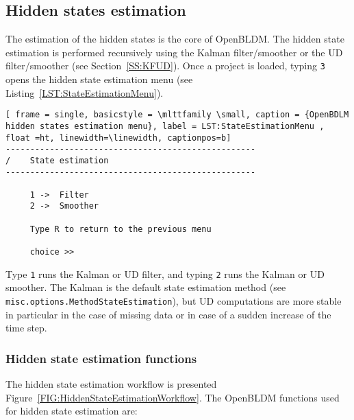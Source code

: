 \subsection{Hidden states estimation}
\label{S:HIDDENSTATESESTIMATION}

The estimation of the hidden states is the core of OpenBLDM.
The hidden state estimation is performed recursively using the Kalman filter/smoother or the UD filter/smoother (see Section~\ref{SS:KFUD}).
Once a project is loaded, typing \colorbox{light-gray}{\lstinline[basicstyle = \mlttfamily \small ]!3!} opens the hidden state estimation menu (see Listing~\ref{LST:StateEstimationMenu}).

\begin{lstlisting}[ frame = single, basicstyle = \mlttfamily \small, caption = {OpenBDLM hidden states estimation menu}, label = LST:StateEstimationMenu ,  float =ht, linewidth=\linewidth, captionpos=b]
---------------------------------------------------
/    State estimation
---------------------------------------------------

     1 ->  Filter 
     2 ->  Smoother 

     Type R to return to the previous menu 

     choice >> 
\end{lstlisting}

Type  \colorbox{light-gray}{\lstinline[basicstyle = \mlttfamily \small ]!1!} runs the Kalman or UD filter, and typing \colorbox{light-gray}{\lstinline[basicstyle = \mlttfamily \small ]!2!} runs the Kalman or UD smoother.
The Kalman is the default state estimation method (see \lstinline[basicstyle = \mlttfamily \small ]!misc.options.MethodStateEstimation!), but UD computations are more stable in particular in the case of missing data or in case of a sudden increase of the time step.

\subsubsection{Hidden state estimation functions}

The hidden state estimation workflow is presented Figure~\ref{FIG:HiddenStateEstimationWorkflow}.
The OpenBLDM functions used for hidden state estimation are:

